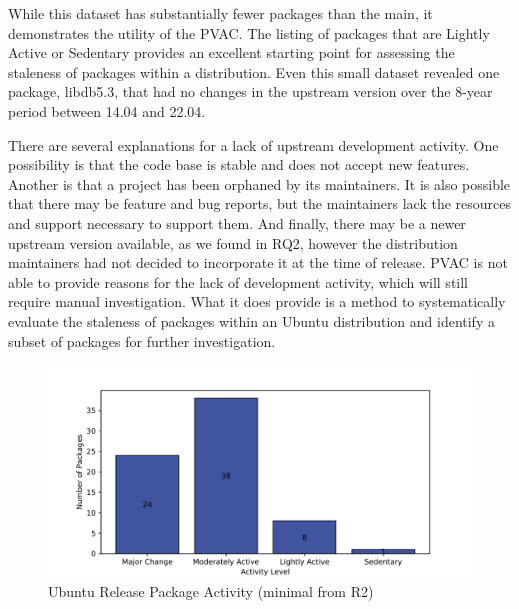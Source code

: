 \documentclass[sn-mathphys-num]{sn-jnl}%
\theoremstyle{thmstyleone}%
\theoremstyle{thmstyletwo}%
\theoremstyle{thmstylethree}%
\begin{document}
While this dataset has substantially fewer packages than the main, it demonstrates the utility of the PVAC. The listing of packages that are Lightly Active or Sedentary provides an excellent starting point for assessing the staleness of packages within a distribution. Even this small dataset revealed one package, libdb5.3, that had no changes in the upstream version over the 8-year period between 14.04 and 22.04. 

There are several explanations for a lack of upstream development activity. One possibility is that the code base is stable and does not accept new features. Another is that a project has been orphaned by its maintainers. It is also possible that there may be feature and bug reports, but the maintainers lack the resources and support necessary to support them. And finally, there may be a newer upstream version available, as we found in RQ2, however the distribution maintainers had not decided to incorporate it at the time of release. PVAC is not able to provide reasons for the lack of development activity, which will still require manual investigation. What it does provide is a method to systematically evaluate the staleness of packages within an Ubuntu distribution and identify a subset of packages for further investigation.

\begin{figure}
    \centering
    \includegraphics[width=1.0\linewidth]{figures/ubuntu-release-minimal-metadata-package-activity.pdf}
    \caption{Ubuntu Release Package Activity (minimal from R2)}
    \label{fig:ubuntu-release-minimal-metadata-package-activity}
\end{figure}
\end{document}
